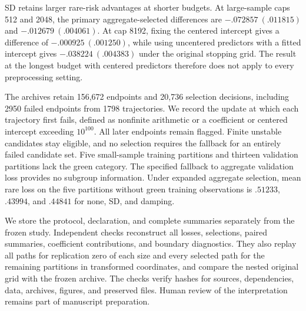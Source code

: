 SD retains larger rare-risk advantages at shorter budgets. At large-sample caps
512 and 2048, the primary aggregate-selected differences are
$-.072857\ (.011815)$ and $-.012679\ (.004061)$. At cap 8192, fixing the
centered intercept gives a difference of $-.000925\ (.001250)$, while using
uncentered predictors with a fitted intercept gives $-.038224\ (.004383)$
under the original stopping grid. The result at the longest budget with centered
predictors therefore does not apply to every preprocessing setting.

The archives retain 156,672 endpoints and 20,736 selection decisions, including
2950 failed endpoints from 1798 trajectories. We record the update at which each
trajectory first fails, defined as nonfinite arithmetic or a coefficient or
centered intercept exceeding $10^{100}$. All later endpoints remain flagged.
Finite unstable candidates stay eligible, and no selection requires the
fallback for an entirely failed candidate set. Five small-sample training
partitions and thirteen validation partitions lack the green category. The
specified fallback to aggregate validation loss provides no subgroup
information. Under expanded aggregate selection, mean rare loss on the five
partitions without green training observations is $.51233$, $.43994$, and
$.44841$ for none, SD, and damping.

We store the protocol, declaration, and complete summaries separately from the
frozen study. Independent checks reconstruct all losses, selections, paired
summaries, coefficient contributions, and boundary diagnostics. They also replay
all paths for replication zero of each size and every selected path for the
remaining partitions in transformed coordinates, and compare the nested
original grid with the frozen archive. The checks verify hashes for sources,
dependencies, data, archives, figures, and preserved files. Human review of the
interpretation remains part of manuscript preparation.
